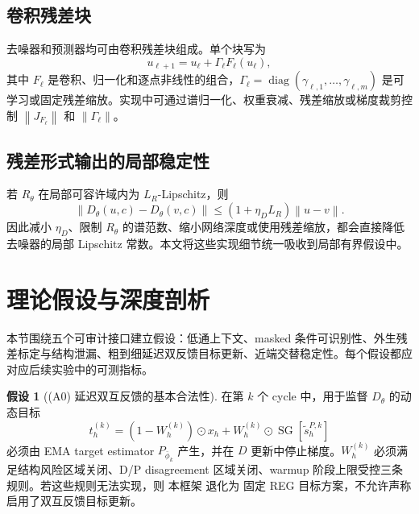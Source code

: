 \documentclass[11pt,a4paper,UTF8,fontset=fandol]{ctexart}
\theoremstyle{definition}
\newtheorem{assumption}[theorem]{假设}
\DeclareMathOperator{\diag}{diag}
\DeclareMathOperator{\SG}{SG}
\newcommand{\norm}[1]{\left\lVert#1\right\rVert}
\begin{document}
\subsection{卷积残差块}

去噪器和预测器均可由卷积残差块组成。单个块写为
\begin{equation}
\label{eq:conv-residual-block}
    u_{\ell+1}=u_\ell+\Gamma_\ell F_\ell(u_\ell),
\end{equation}
其中 $F_\ell$ 是卷积、归一化和逐点非线性的组合，$\Gamma_\ell=\diag(\gamma_{\ell,1},\ldots,\gamma_{\ell,m})$ 是可学习或固定残差缩放。实现中可通过谱归一化、权重衰减、残差缩放或梯度裁剪控制 $\norm{J_{F_\ell}}$ 和 $\norm{\Gamma_\ell}$。

\subsection{残差形式输出的局部稳定性}

若 $R_\theta$ 在局部可容许域内为 $L_R$-Lipschitz，则
\begin{equation}
    \norm{D_\theta(u,c)-D_\theta(v,c)}
    \le (1+\eta_D L_R)\norm{u-v}.
\end{equation}
因此减小 $\eta_D$、限制 $R_\theta$ 的谱范数、缩小网络深度或使用残差缩放，都会直接降低去噪器的局部 Lipschitz 常数。本文将这些实现细节统一吸收到局部有界假设中。



\section{理论假设与深度剖析}
\label{sec:assumptions}

本节围绕五个可审计接口建立假设：低通上下文、masked 条件可识别性、外生残差标定与结构泄漏、粗到细延迟双反馈目标更新、近端交替稳定性。每个假设都应对应后续实验中的可测指标。

\begin{assumption}[(A0) 延迟双互反馈的基本合法性]
在第 $k$ 个 cycle 中，用于监督 $D_\theta$ 的动态目标
\begin{equation}
    t_h^{(k)}=(1-W_h^{(k)})\odot x_h+W_h^{(k)}\odot\SG[\tilde s_h^{P,k}]
\end{equation}
必须由 EMA target estimator $P_{\bar\phi_k}$ 产生，并在 $D$ 更新中停止梯度。$W_h^{(k)}$ 必须满足结构风险区域关闭、D/P disagreement 区域关闭、warmup 阶段上限受控三条规则。若这些规则无法实现，则 本框架 退化为 固定 REG 目标方案，不允许声称启用了双互反馈目标更新。
\end{assumption}
\end{document}
